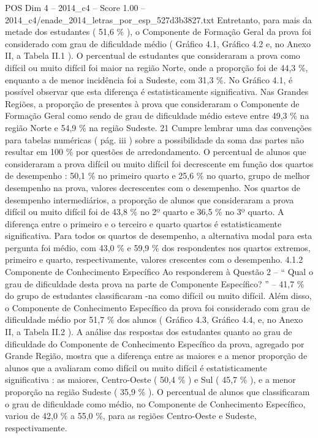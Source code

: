 \begin{textsample}{POS Dim 4 – 2014\_c4 – Score 1.00 – 2014\_c4/enade\_2014\_letras\_por\_esp\_527d3b3827.txt}
Entretanto, para mais da metade dos estudantes ( 51,6 \% ), o Componente de Formação Geral da prova foi considerado com grau de dificuldade médio ( Gráfico 4.1, Gráfico 4.2 e, no Anexo II, a Tabela II.1 ).
O percentual de estudantes que consideraram a prova como difícil ou muito difícil foi maior na região Norte, onde a proporção foi de 44,3 \%, enquanto a de menor incidência foi a Sudeste, com 31,3 \%.
No Gráfico 4.1, é possível observar que esta diferença é estatisticamente significativa.
Nas Grandes Regiões, a proporção de presentes à prova que consideraram o Componente de Formação Geral como sendo de grau de dificuldade médio esteve entre 49,3 \% na região Norte e 54,9 \% na região Sudeste. 21 Cumpre lembrar uma das convenções para tabelas numéricas ( pág. iii ) sobre a possibilidade da soma das partes não resultar em 100 \% por questões de arredondamento.
O percentual de alunos que consideraram a prova difícil ou muito difícil foi decrescente em função dos quartos de desempenho : 50,1 \% no primeiro quarto e 25,6 \% no quarto, grupo de melhor desempenho na prova, valores decrescentes com o desempenho.
Nos quartos de desempenho intermediários, a proporção de alunos que consideraram a prova difícil ou muito difícil foi de 43,8 \% no 2º quarto e 36,5 \% no 3º quarto.
A diferença entre o primeiro e o terceiro e quarto quartos é estatisticamente significativa.
Para todos os quartos de desempenho, a alternativa modal para esta pergunta foi médio, com 43,0 \% e 59,9 \% dos respondentes nos quartos extremos, primeiro e quarto, respectivamente, valores crescentes com o desempenho. 4.1.2 Componente de Conhecimento Específico Ao responderem à Questão 2 – “ Qual o grau de dificuldade desta prova na parte de Componente Específico? ” – 41,7 \% do grupo de estudantes classificaram -na como difícil ou muito difícil.
Além disso, o Componente de Conhecimento Específico da prova foi considerado com grau de dificuldade médio por 51,7 \% dos alunos ( Gráfico 4.3, Gráfico 4.4, e, no Anexo II, a Tabela II.2 ).
A análise das respostas dos estudantes quanto ao grau de dificuldade do Componente de Conhecimento Específico da prova, agregado por Grande Região, mostra que a diferença entre as maiores e a menor proporção de alunos que a avaliaram como difícil ou muito difícil é estatisticamente significativa : as maiores, Centro-Oeste ( 50,4 \% ) e Sul ( 45,7 \% ), e a menor proporção na região Sudeste ( 35,9 \% ).
O percentual de alunos que classificaram o grau de dificuldade como médio, no Componente de Conhecimento Específico, variou de 42,0 \% a 55,0 \%, para as regiões Centro-Oeste e Sudeste, respectivamente.

\end{textsample}
